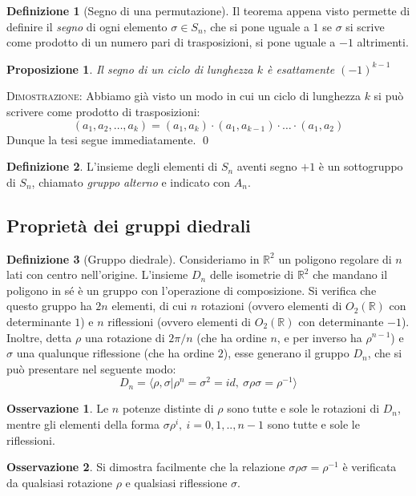 \documentclass[11pt]{article}
\theoremstyle{plain}
\newtheorem{prop}[thm]{Proposizione}
\theoremstyle{definition}
\newtheorem{defn}{Definizione}[section]
\newtheorem*{rem}{Osservazione}
\theoremstyle{remark}
\newcommand{\R}{\mathbb{R}}
\begin{document}
\begin{defn}[Segno di una permutazione]
Il teorema appena visto permette di definire il \emph{segno} di ogni elemento $\sigma\in S_n$, che si pone uguale a $1$
se $\sigma$ si scrive come prodotto di un numero pari di trasposizioni, si pone uguale a $-1$ altrimenti.
\end{defn}

\begin{prop}
Il segno di un ciclo di lunghezza $k$ è esattamente $(-1)^{k-1}$
\end{prop}
\textsc{Dimostrazione: }
Abbiamo già visto un modo in cui un ciclo di lunghezza $k$ si può scrivere come prodotto di trasposizioni:
\[(a_1, a_2, \dots, a_k) = (a_1, a_k)\cdot (a_1, a_{k-1}) \cdot \dots \cdot (a_1, a_2)\]
Dunque la tesi segue immediatamente.
\qed

\begin{defn}
L'insieme degli elementi di $S_n$ aventi segno $+1$ è un sottogruppo di $S_n$,
chiamato \emph{gruppo alterno} e indicato con $A_n$.
\end{defn}


\subsection{Proprietà dei gruppi diedrali}

\begin{defn}[Gruppo diedrale]
Consideriamo in $\R^2$ un poligono regolare di $n$ lati con centro nell'origine.
L'insieme $D_n$ delle isometrie di $\R^2$ che mandano il poligono in sé è un gruppo con l'operazione di composizione.
Si verifica che questo gruppo ha $2n$ elementi, di cui $n$ rotazioni (ovvero elementi di $O_2(\R)$ con determinante $1$)
e $n$ riflessioni (ovvero elementi di $O_2(\R)$ con determinante $-1$).
Inoltre, detta $\rho$ una rotazione di $2\pi/n$ (che ha ordine $n$, e per inverso ha $\rho^{n-1}$) e $\sigma$ una qualunque riflessione (che ha ordine $2$), esse generano
il gruppo $D_n$, che si può presentare nel seguente modo: $$D_n=\langle\rho,\sigma|\rho^n=\sigma^2=id,\ \sigma\rho\sigma=\rho^{-1}\rangle$$
\end{defn}

\begin{rem}
 Le $n$ potenze distinte di $\rho$ sono tutte e sole le rotazioni di $D_n$, mentre gli elementi della forma $\sigma\rho^{i},\ i=0,1,..,n-1$ 
 sono tutte e sole le riflessioni. 
\end{rem}

\begin{rem}
 Si dimostra facilmente che la relazione $\sigma\rho\sigma=\rho^{-1}$ è verificata da qualsiasi rotazione $\rho$
 e qualsiasi riflessione $\sigma$.
\end{rem}
\end{document}
